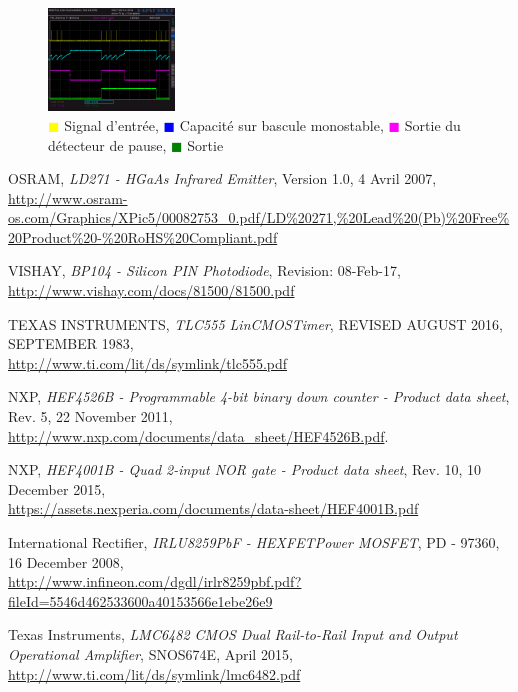 \documentclass[french]{layout/Report}
\begin{document}
\begin{figure}[H]
\centering
\includegraphics[width=0.3\textwidth]{../measurements/SCR12}
\caption{
\textcolor{yellow}{$\blacksquare$} Signal d'entrée,
\textcolor{blue}{$\blacksquare$} Capacité sur bascule monostable,
\textcolor{magenta}{$\blacksquare$} Sortie du détecteur de pause,
\textcolor{green}{$\blacksquare$} Sortie
}
\label{fig:output_signal}
\end{figure}

\begin{thebibliography}{9}

	OSRAM,
	\textit{LD271 - HGaAs Infrared Emitter},
	Version 1.0,
	4 Avril 2007,
	\url{http://www.osram-os.com/Graphics/XPic5/00082753_0.pdf/LD%20271,%20Lead%20(Pb)%20Free%20Product%20-%20RoHS%20Compliant.pdf}

		VISHAY,
		\textit{BP104 - Silicon PIN Photodiode},
		Revision: 08-Feb-17,\\
		\url{http://www.vishay.com/docs/81500/81500.pdf}

		TEXAS INSTRUMENTS,
		\textit{TLC555 LinCMOS\texttrademark Timer},
		REVISED AUGUST 2016,
		SEPTEMBER 1983,\\
		\url{http://www.ti.com/lit/ds/symlink/tlc555.pdf}

		NXP,
		\textit{HEF4526B - Programmable 4-bit binary down counter - Product data sheet},
		Rev. 5,
		22 November 2011,\\
		\url{http://www.nxp.com/documents/data_sheet/HEF4526B.pdf}.

        NXP,
        \textit{HEF4001B - Quad 2-input NOR gate - Product data sheet},
        Rev. 10,
        10 December 2015,\\
        \url{https://assets.nexperia.com/documents/data-sheet/HEF4001B.pdf}

        International Rectifier,
        \textit{IRLU8259PbF - HEXFET\textregistered Power MOSFET},
        PD - 97360,
        16 December 2008,\\
        \url{http://www.infineon.com/dgdl/irlr8259pbf.pdf?fileId=5546d462533600a40153566e1ebe26e9}

		Texas Instruments,
		\textit{LMC6482 CMOS Dual Rail-to-Rail Input and Output Operational Amplifier},
		SNOS674E,
		April 2015,\\
		\url{http://www.ti.com/lit/ds/symlink/lmc6482.pdf}

\end{thebibliography}


\end{document}
